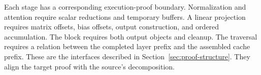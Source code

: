 Each stage has a corresponding execution-proof boundary.  Normalization and attention require scalar reductions and temporary buffers.  A linear projection requires matrix offsets, bias offsets, output construction, and ordered accumulation.  The block requires both output objects and cleanup.  The traversal requires a relation between the completed layer prefix and the assembled cache prefix.  These are the interfaces described in Section~\ref{sec:proof-structure}.  They align the target proof with the source's decomposition.
